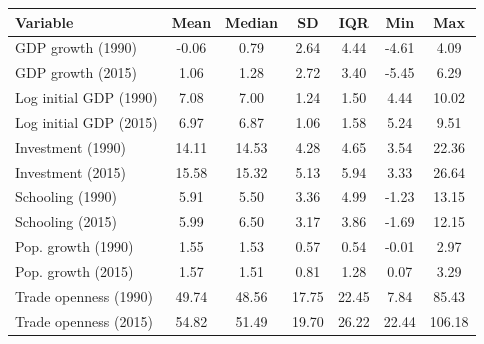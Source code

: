 \begin{tabular}{lcccccc}
\toprule
Variable & Mean & Median & SD & IQR & Min & Max \\
\midrule
GDP growth (1990) & -0.06 & 0.79 & 2.64 & 4.44 & -4.61 & 4.09 \\
GDP growth (2015) & 1.06 & 1.28 & 2.72 & 3.40 & -5.45 & 6.29 \\
Log initial GDP (1990) & 7.08 & 7.00 & 1.24 & 1.50 & 4.44 & 10.02 \\
Log initial GDP (2015) & 6.97 & 6.87 & 1.06 & 1.58 & 5.24 & 9.51 \\
Investment (1990) & 14.11 & 14.53 & 4.28 & 4.65 & 3.54 & 22.36 \\
Investment (2015) & 15.58 & 15.32 & 5.13 & 5.94 & 3.33 & 26.64 \\
Schooling (1990) & 5.91 & 5.50 & 3.36 & 4.99 & -1.23 & 13.15 \\
Schooling (2015) & 5.99 & 6.50 & 3.17 & 3.86 & -1.69 & 12.15 \\
Pop. growth (1990) & 1.55 & 1.53 & 0.57 & 0.54 & -0.01 & 2.97 \\
Pop. growth (2015) & 1.57 & 1.51 & 0.81 & 1.28 & 0.07 & 3.29 \\
Trade openness (1990) & 49.74 & 48.56 & 17.75 & 22.45 & 7.84 & 85.43 \\
Trade openness (2015) & 54.82 & 51.49 & 19.70 & 26.22 & 22.44 & 106.18 \\
\bottomrule
\end{tabular}
